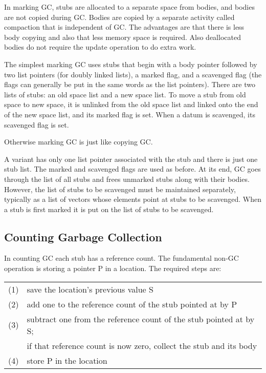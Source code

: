 \documentclass[12pt]{article}
\begin{document}
In marking GC, stubs are allocated to a separate space
from bodies, and bodies are not copied during GC.
Bodies are copied by a separate activity called
compaction that is independent of GC.  The advantages
are that there is less body copying and also that less memory
space is required.  Also deallocated bodies do not
require the update operation to do extra work.

The simplest marking GC uses stubs that begin with
a body pointer followed by two list pointers (for doubly linked lists),
a marked flag, and a scavenged flag (the flags can generally
be put in the same words as the list pointers).  There are two lists
of stubs: an old space list and a new space
list.  To move a stub from old space to new space,
it is unlinked from the old space list and linked
onto the end of the new space list, and its marked
flag is set.  When a datum is scavenged, its scavenged
flag is set.

Otherwise marking GC is just like copying GC.

A variant has only one list pointer associated with
the stub and there is just one stub list.  The
marked and scavenged flags are used as before.
At its end, GC goes through the list of all stubs
and frees unmarked stubs along with their bodies.
However, the list of stubs to be scavenged must
be maintained separately, typically as a list of
vectors whose elements point at stubs to be scavenged.
When a stub is first marked it is put on the list
of stubs to be scavenged.

\subsection{Counting Garbage Collection}

In counting GC each stub has a reference
count.  The fundamental non-GC operation is storing
a pointer P in a location.  The required steps are:
\begin{center}
\begin{tabular}{rl}
(1) & save the location's previous value S \\
(2) & add one to the reference count of the stub pointed at by P \\
(3) & subtract one from the reference count of the stub pointed at by S; \\
    & if that reference count is now zero, collect the stub and its body \\
(4) & store P in the location
\end{tabular}
\end{center}
\end{document}
